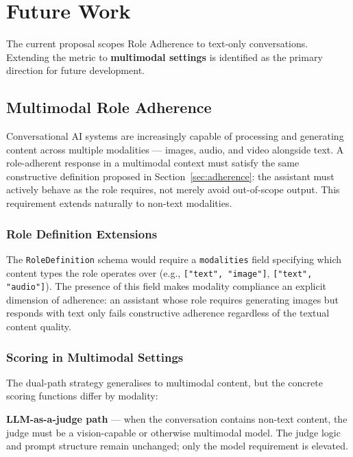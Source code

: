 \documentclass[11pt,a4paper]{article}
\begin{document}
\section{Future Work}

The current proposal scopes Role Adherence to text-only conversations.
Extending the metric to \textbf{multimodal settings} is identified as the
primary direction for future development.

\subsection{Multimodal Role Adherence}

Conversational AI systems are increasingly capable of processing and generating
content across multiple modalities --- images, audio, and video alongside text.
A role-adherent response in a multimodal context must satisfy the same
constructive definition proposed in Section~\ref{sec:adherence}: the assistant
must actively behave as the role requires, not merely avoid out-of-scope
output. This requirement extends naturally to non-text modalities.

\subsubsection{Role Definition Extensions}

The \texttt{RoleDefinition} schema would require a \texttt{modalities} field
specifying which content types the role operates over (e.g.,
\texttt{["text", "image"]}, \texttt{["text", "audio"]}). The presence of this
field makes modality compliance an explicit dimension of adherence: an
assistant whose role requires generating images but responds with text only
fails constructive adherence regardless of the textual content quality.

\subsubsection{Scoring in Multimodal Settings}

The dual-path strategy generalises to multimodal content, but the concrete
scoring functions differ by modality:

\textbf{LLM-as-a-judge path} --- when the conversation contains non-text
content, the judge must be a vision-capable or otherwise multimodal model.
The judge logic and prompt structure remain unchanged; only the model
requirement is elevated.
\end{document}
